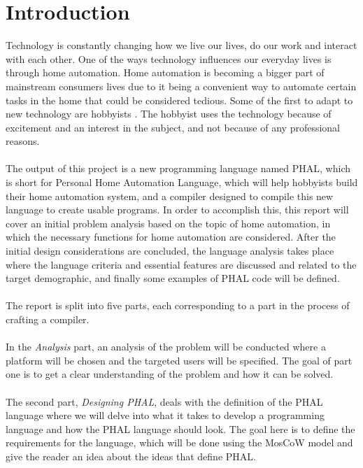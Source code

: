 \chapter{Introduction}\label{ch:Introduction}
Technology is constantly changing how we live our lives, do our work and interact with each other. One of the ways technology influences our everyday lives is through home automation. Home automation is becoming a bigger part of mainstream consumers lives due to it being a convenient way to automate certain tasks in the home that could be considered tedious. Some of the first to adapt to new technology are hobbyists \cite{TheHobbyistRenaissance}. The hobbyist uses the technology because of excitement and an interest in the subject, and not because of any professional reasons.
\\\\
The output of this project is a new programming language named PHAL, which is short for Personal Home Automation Language, which will help hobbyists build their home automation system, and a compiler designed to compile this new language to create usable programs. In order to accomplish this, this report will cover an initial problem analysis based on the topic of home automation, in which the necessary functions for home automation are considered. After the initial design considerations are concluded, the language analysis takes place where the language criteria and essential features are discussed and related to the target demographic, and finally some examples of PHAL code will be defined. 
\\\\
The report is split into five parts, each corresponding to a part in the process of crafting a compiler.
\\\\
In the \textit{Analysis} part, an analysis of the problem will be conducted where a platform will be chosen and the targeted users will be specified. The goal of part one is to get a clear understanding of the problem and how it can be solved.
\\\\
The second part, \textit{Designing PHAL}, deals with the definition of the PHAL language where we will delve into what it takes to develop a programming language and how the PHAL language should look.
The goal here is to define the requirements for the language, which will be done using the MosCoW model and give the reader an idea about the ideas that define PHAL.
\\\\
